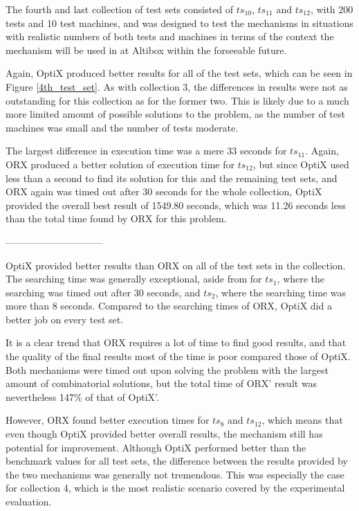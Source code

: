 The fourth and last collection of test sets consisted of $ts_{10}$, $ts_{11}$ and $ts_{12}$, with 200 tests and 10 test machines, and was designed to test the mechanisms in situations with realistic numbers of both tests and machines in terms of the context the mechanism will be used in at Altibox within the forseeable future.

Again, OptiX produced better results for all of the test sets, which can be seen in Figure \ref{4th_test_set}. As with collection 3, the differences in results were not as outstanding for this collection as for the former two. This is likely due to a much more limited amount of possible solutions to the problem, as the number of test machines was small and the number of tests moderate.

The largest difference in execution time was a mere 33 seconds for $ts_{11}$. Again, ORX produced a better solution of execution time for $ts_{12}$, but since OptiX used less than a second to find its solution for this and the remaining test sets, and ORX again was timed out after 30 seconds for the whole collection, OptiX provided the overall best result of 1549.80 seconds, which was 11.26 seconds less than the total time found by ORX for this problem.

\begin{center}------------------------------\end{center}

\noindent OptiX provided better results than ORX on all of the test sets in the collection. The searching time was generally exceptional, aside from for $ts_1$, where the searching was timed out after 30 seconds, and $ts_2$, where the searching time was more than 8 seconds. Compared to the searching times of ORX, OptiX did a better job on every test set.

It is a clear trend that ORX requires a lot of time to find good results, and that the quality of the final results most of the time is poor compared those of OptiX. Both mechanisms were timed out upon solving the problem with the largest amount of combinatorial solutions, but the total time of ORX' result was nevertheless 147\% of that of OptiX'.

However, ORX found better execution times for $ts_8$ and $ts_{12}$, which means that even though OptiX provided better overall results, the mechanism still has potential for improvement. Although OptiX performed better than the benchmark values for all test sets, the difference between the results provided by the two mechanisms was generally not tremendous. This was especially the case for collection 4, which is the most realistic scenario covered by the experimental evaluation.

